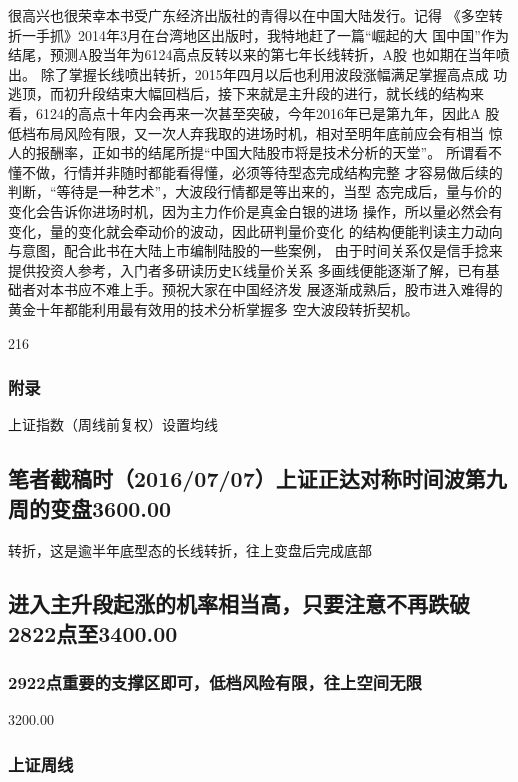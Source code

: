 \documentclass{article}
\begin{document}
很高兴也很荣幸本书受广东经济出版社的青得以在中国大陆发行。记得 《多空转折一手抓》2014年3月在台湾地区出版时，我特地赶了一篇“崛起的大 国中国”作为结尾，预测A股当年为6124高点反转以来的第七年长线转折，A股 也如期在当年喷出。 除了掌握长线喷出转折，2015年四月以后也利用波段涨幅满足掌握高点成 功逃顶，而初升段结束大幅回档后，接下来就是主升段的进行，就长线的结构来 看，6124的高点十年内会再来一次甚至突破，今年2016年已是第九年，因此A 股低档布局风险有限，又一次人弃我取的进场时机，相对至明年底前应会有相当 惊人的报酬率，正如书的结尾所提“中国大陆股市将是技术分析的天堂”。 所谓看不懂不做，行情并非随时都能看得懂，必须等待型态完成结构完整 才容易做后续的判断，“等待是一种艺术”，大波段行情都是等出来的，当型 态完成后，量与价的变化会告诉你进场时机，因为主力作价是真金白银的进场 操作，所以量必然会有变化，量的变化就会牵动价的波动，因此研判量价变化 的结构便能判读主力动向与意图，配合此书在大陆上市编制陆股的一些案例， 由于时间关系仅是信手捻来提供投资人参考，入门者多研读历史K线量价关系 多画线便能逐渐了解，已有基础者对本书应不难上手。预祝大家在中国经济发 展逐渐成熟后，股市进入难得的黄金十年都能利用最有效用的技术分析掌握多 空大波段转折契机。

216

\clearpage

\subsubsection{附录}

上证指数（周线前复权）设置均线

\subsection{笔者截稿时（2016/07/07）上证正达对称时间波第九周的变盘3600.00}

转折，这是逾半年底型态的长线转折，往上变盘后完成底部

\subsection{进入主升段起涨的机率相当高，只要注意不再跌破2822点至3400.00}

\subsubsection{2922点重要的支撑区即可，低档风险有限，往上空间无限}

3200.00

\subsubsection{上证周线}
\end{document}
